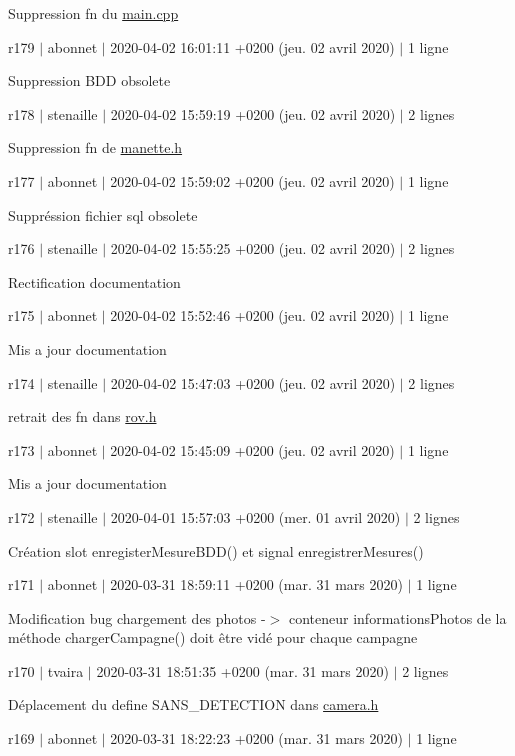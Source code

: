 Suppression fn du \hyperlink{main_8cpp}{main.\+cpp}

r179 $\vert$ abonnet $\vert$ 2020-\/04-\/02 16\+:01\+:11 +0200 (jeu. 02 avril 2020) $\vert$ 1 ligne

Suppression B\+DD obsolete

r178 $\vert$ stenaille $\vert$ 2020-\/04-\/02 15\+:59\+:19 +0200 (jeu. 02 avril 2020) $\vert$ 2 lignes

Suppression fn de \hyperlink{manette_8h}{manette.\+h}

r177 $\vert$ abonnet $\vert$ 2020-\/04-\/02 15\+:59\+:02 +0200 (jeu. 02 avril 2020) $\vert$ 1 ligne

Suppréssion fichier sql obsolete

r176 $\vert$ stenaille $\vert$ 2020-\/04-\/02 15\+:55\+:25 +0200 (jeu. 02 avril 2020) $\vert$ 2 lignes

Rectification documentation

r175 $\vert$ abonnet $\vert$ 2020-\/04-\/02 15\+:52\+:46 +0200 (jeu. 02 avril 2020) $\vert$ 1 ligne

Mis a jour documentation

r174 $\vert$ stenaille $\vert$ 2020-\/04-\/02 15\+:47\+:03 +0200 (jeu. 02 avril 2020) $\vert$ 2 lignes

retrait des fn dans \hyperlink{rov_8h}{rov.\+h}

r173 $\vert$ abonnet $\vert$ 2020-\/04-\/02 15\+:45\+:09 +0200 (jeu. 02 avril 2020) $\vert$ 1 ligne

Mis a jour documentation

r172 $\vert$ stenaille $\vert$ 2020-\/04-\/01 15\+:57\+:03 +0200 (mer. 01 avril 2020) $\vert$ 2 lignes

Création slot enregister\+Mesure\+B\+D\+D() et signal enregistrer\+Mesures()

r171 $\vert$ abonnet $\vert$ 2020-\/03-\/31 18\+:59\+:11 +0200 (mar. 31 mars 2020) $\vert$ 1 ligne

Modification bug chargement des photos -\/$>$ conteneur informations\+Photos de la méthode charger\+Campagne() doit être vidé pour chaque campagne

r170 $\vert$ tvaira $\vert$ 2020-\/03-\/31 18\+:51\+:35 +0200 (mar. 31 mars 2020) $\vert$ 2 lignes

Déplacement du define S\+A\+N\+S\+\_\+\+D\+E\+T\+E\+C\+T\+I\+ON dans \hyperlink{camera_8h}{camera.\+h}

r169 $\vert$ abonnet $\vert$ 2020-\/03-\/31 18\+:22\+:23 +0200 (mar. 31 mars 2020) $\vert$ 1 ligne

